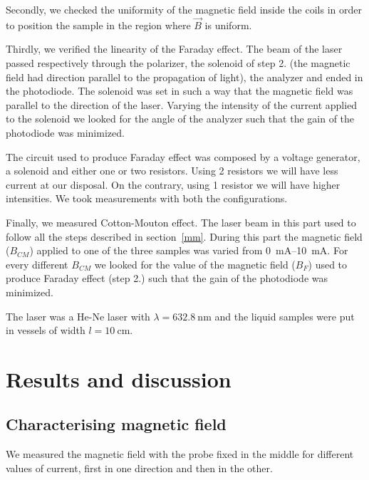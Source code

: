\documentclass[11pt,a4paper]{article}
\begin{document}
Secondly, we checked the uniformity of the magnetic field inside the coils in order to position the sample in the region where $\vec{B}$ is uniform.

Thirdly, we verified the linearity of the Faraday effect. The beam of the laser passed respectively through the polarizer, the solenoid of step 2. (the magnetic field had direction parallel to the propagation of light), the analyzer and ended in the photodiode. The solenoid was set in such a way that the magnetic field was parallel to the direction of the laser. Varying the intensity of the current applied to the solenoid we looked for the angle of the analyzer such that the gain of the photodiode was minimized.

The circuit used to produce Faraday effect was composed by a voltage generator, a solenoid and either one or two resistors. Using 2 resistors we will have less current at our disposal. On the contrary, using 1 resistor we will have higher intensities. We took measurements with both the configurations.

Finally, we measured Cotton-Mouton effect. The laser beam in this part used to follow all the steps described in section~\ref{mm}. During this part the magnetic field ($B_{CM}$) applied to one of the three samples was varied from \SIrange{0}{10}{\mA}. For every different $B_{CM}$ we looked for the value of the magnetic field ($B_F$) used to produce Faraday effect (step 2.) such that the gain of the photodiode was minimized.

The laser was a He-Ne laser with $\lambda=\SI{632.8}{\nm}$ and the liquid samples were put in vessels of width $l=\SI{10}{\cm}$.

\newpage

\section{Results and discussion}

\subsection{Characterising magnetic field}

We measured the magnetic field with the probe fixed in the middle for different values of current, first in one direction and then in the other.
\end{document}
